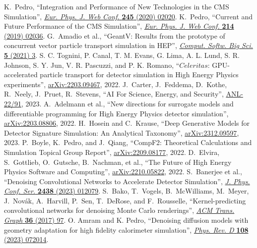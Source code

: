 \begin{thebibliography}{99}
 K.~Pedro, ``Integration and Performance of New Technologies in the CMS Simulation'', \href{https://doi.org/10.1051/epjconf/202024502020}{\textit{Eur. Phys. J. Web Conf.} \textbf{245} (2020) 02020}.
 K.~Pedro, ``Current and Future Performance of the CMS Simulation'', \href{https://doi.org/10.1051/epjconf/201921402036}{\textit{Eur. Phys. J. Web Conf.} \textbf{214} (2019) 02036}.
 G.~Amadio et al., ``GeantV: Results from the prototype of concurrent vector particle transport simulation in HEP'', \href{https://doi.org/10.1007/s41781-020-00048-6}{\textit{Comput. Softw. Big Sci.} \textbf{5} (2021) 3}.
 S. C. Tognini, P. Canal, T. M. Evans, G. Lima, A. L. Lund, S. R. Johnson, S. Y. Jun, V. R. Pascuzzi, and P. K. Romano, ``$Celeritas$: GPU-accelerated particle transport for detector simulation in High Energy Physics experiments'', \href{https://arxiv.org/abs/2203.09467}{arXiv:2203.09467}, 2022.
 J.~Carter, J.~Feddema, D.~Kothe, R.~Neely, J.~Pruet, R.~Stevens, ``AI For Science, Energy, and Security'', \href{https://www.anl.gov/ai-for-science-report}{ANL-22/91}, 2023.
 A.~Adelmann et al., ``New directions for surrogate models and differentiable programming for High Energy Physics detector simulation'', \href{https://arxiv.org/abs/2203.08806}{arXiv:2203.08806}, 2022.
 H.~Hosein and C.~Krause, ``Deep Generative Models for Detector Signature Simulation: An Analytical Taxonomy'', \href{https://arxiv.org/abs/2312.09597}{arXiv:2312.09597}, 2023.
 P.~Boyle, K.~Pedro, and J.~Qiang, ``CompF2: Theoretical Calculations and Simulation Topical Group Report'', \href{https://arxiv.org/abs/2209.08177}{arXiv:2209.08177}, 2022.
 D.~Elvira, S.~Gottlieb, O.~Gutsche, B.~Nachman, et al., ``The Future of High Energy Physics Software and Computing'', \href{https://arxiv.org/abs/2210.05822}{arXiv:2210.05822}, 2022.
 S.~Banerjee et al., ``Denoising Convolutional Networks to Accelerate Detector Simulation'', \href{https://doi.org/10.1088/1742-6596/2438/1/012079}{\textit{J. Phys. Conf. Ser.} \textbf{2438} (2023) 012079}.
 S.~Bako, T.~Vogels, B.~McWilliams, M.~Meyer, J.~Nov\'ak, A.~Harvill, P.~Sen, T.~DeRose, and F.~Rousselle, ``Kernel-predicting convolutional networks for denoising Monte Carlo renderings'', \href{https://doi.org/10.1145/3072959.3073708}{\textit{ACM Trans. Graph} \textbf{36} (2017) 97}.
 O. Amram and K. Pedro, ``Denoising diffusion models with geometry adaptation for high fidelity calorimeter simulation'', \href{https://doi.org/10.1103/PhysRevD.108.072014}{\textit{Phys. Rev. D} \textbf{108} (2023) 072014}.

\end{thebibliography}
